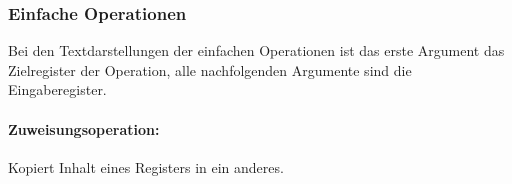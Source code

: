 \documentclass[twoside,a4paper,fleqn,12pt]{book}
\begin{document}
\subsubsection{Einfache Operationen}

Bei den Textdarstellungen der einfachen Operationen ist das erste Argument das Zielregister der Operation, alle nachfolgenden
Argumente sind die Eingaberegister.

\newcommand\SeqOpSample[2]{
  \renewcommand{\baselinestretch}{1.0}\normalsize
  \emph{Beispiel und Zwischencode:}\\
  \makebox[\textwidth]{
    \centering
    \begin{minipage}{7cm}\end{minipage}
    \begin{minipage}{8cm}\end{minipage}
    \label{fig:ir_example_#1}
  }
  \renewcommand{\baselinestretch}{1.50}\normalsize
}
\newcommand\SeqOpSampleStackedSeparate[3]{
  \vspace*{1em}
  \emph{Beispiel und Zwischencode:}
  \vspace*{-1em}
  \renewcommand{\baselinestretch}{1.0}\normalsize
    \begin{center}
    \begin{minipage}{7cm}\end{minipage}
    \begin{minipage}{\textwidth}\end{minipage}
    \label{fig:ir_example_#1}
    \end{center}
    \vspace*{-1em}
  \renewcommand{\baselinestretch}{1.50}\normalsize
}
\newcommand\SeqOpSampleStacked[2]{\SeqOpSampleStackedSeparate{#1}{#1}{#2}}

\paragraph{Zuweisungsoperation:} Kopiert Inhalt eines Registers in ein anderes.
\end{document}
